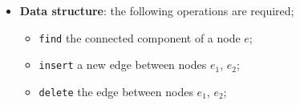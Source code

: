 \begin{frame}[fragile]{\secname}{\subsecname}
\begin{block}
\begin{itemize}
\begin{multicols}{2}
\tikzexternaldisable
\end{multicols}
\vspace{-.4cm}
\item<19-> \textbf{Data structure}: the following operations are required;
\begin{itemize}
\item<20-> \texttt{find} the connected component of a node $e$;
\item<21-> \texttt{insert} a new edge between nodes $e_1$, $e_2$;
\item<22-> \texttt{delete} the edge between nodes $e_1$, $e_2$;
\end{itemize}
\end{itemize}
\end{block}
\end{frame}

